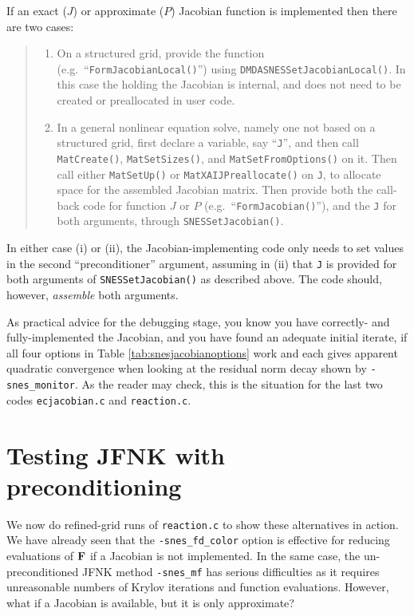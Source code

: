 If an exact ($J$) or approximate ($P$) Jacobian function is implemented then there are two cases:
\begin{quote}
  \renewcommand{\labelenumi}{(\roman{enumi})}
  \begin{enumerate}
  \item On a structured grid, provide the function (e.g.~``\texttt{FormJacobianLocal()}'') using \texttt{DMDASNESSetJacobianLocal()}.  In this case the \pMat holding the Jacobian is internal, and does not need to be created or preallocated in user code.
  \item In a general nonlinear equation solve, namely one not based on a structured grid, first declare a \pMat variable, say ``\texttt{J}'', and then call \texttt{MatCreate()}, \texttt{MatSetSizes()}, and \texttt{MatSetFromOptions()} on it.  Then call either \texttt{MatSetUp()} or \texttt{MatXAIJPreallocate()} on \texttt{J}, to allocate space for the assembled Jacobian matrix.  Then provide both the call-back code for function $J$ or $P$ (e.g.~``\texttt{FormJacobian()}''), and the \pMat \texttt{J} for both \pMat arguments, through \texttt{SNESSetJacobian()}.
  \end{enumerate}
\end{quote}
In either case (i) or (ii), the Jacobian-implementing code only needs to set values in the second ``preconditioner'' \pMat argument, assuming in (ii) that \texttt{J} is provided for both \pMat arguments of   \texttt{SNESSetJacobian()} as described above.  The code should, however, \emph{assemble} both \pMat arguments.

As practical advice for the debugging stage, you know you have correctly- and fully-implemented the Jacobian, and you have found an adequate initial iterate, if all four options in Table \ref{tab:snesjacobianoptions} work and each gives apparent quadratic convergence when looking at the residual norm decay shown by \texttt{-snes\_monitor}.  As the reader may check, this is the situation for the last two codes \texttt{ecjacobian.c} and \texttt{reaction.c}.


\section{Testing JFNK with preconditioning} \label{sec:testsnesmfoperator}

We now do refined-grid runs of \texttt{reaction.c} to show these alternatives in action.  We have already seen that the \texttt{-snes\_fd\_color} option is effective for reducing evaluations of $\mathbf{F}$ if a Jacobian is not implemented.  In the same case, the un-preconditioned JFNK method \texttt{-snes\_mf} has serious difficulties as it requires unreasonable numbers of Krylov iterations and function evaluations.  However, what if a Jacobian is available, but it is only approximate?

